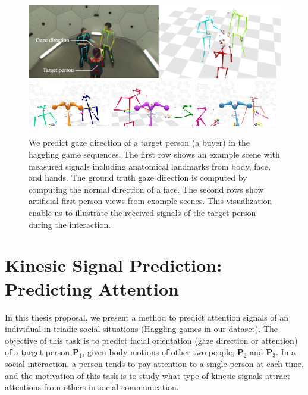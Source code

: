 \begin{figure}[t]
	\centering
	\includegraphics[width=\textwidth]{figures/pred_gaze_ex}\\
	\includegraphics[width=0.32\textwidth]{figures/firstpersonview_1}
	\includegraphics[width=0.32\textwidth]{figures/firstpersonview_2}
	\includegraphics[width=0.32\textwidth]{figures/firstpersonview_3}
	\caption{We predict gaze direction of a target person (a buyer) in the haggling game sequences. The first row shows an example scene with measured signals including anatomical landmarks from body, face, and hands. The ground truth gaze direction is computed by computing the normal direction of a face. The second rows show artificial first person views from example scenes. This visualization enable us to illustrate the received signals of the target person during the interaction.} 
	\label{fig:gazepred_probdef}
\end{figure}

\section{Kinesic Signal Prediction: Predicting Attention}
In this thesis proposal, we present a method to predict attention signals of an individual in triadic social situations (Haggling games in our dataset). The objective of this task is to predict facial orientation (gaze direction or attention) of a target person $\mathbf{P}_1$, given body motions of other two people, $\mathbf{P}_2$ and $\mathbf{P}_3$. In a social interaction, a person tends to pay attention to a single person at each time, and the motivation of this task is to study what type of kinesic signals attract attentions from others in social communication.

